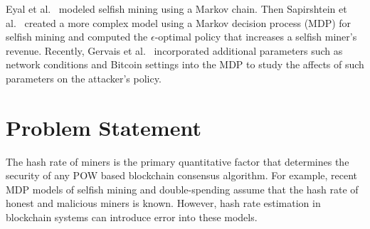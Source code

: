 Eyal et al.~\cite{eyal:2014} modeled selfish mining using a Markov chain. Then Sapirshtein et al.~\cite{sapirshtein:2015} created a more complex model using a Markov decision process (MDP) for selfish mining and computed the $\epsilon$-optimal policy that increases a selfish miner's revenue. Recently, Gervais et al.~\cite{Gervais:2016} incorporated additional parameters such as network conditions and Bitcoin settings into the MDP to study the affects of such parameters on the attacker's policy. %

\section{Problem Statement}
The hash rate of miners is the primary quantitative factor that determines the security of any POW based blockchain consensus algorithm. For example, recent MDP models of selfish mining and double-spending assume that the hash rate of honest and malicious miners is known. However, hash rate estimation in blockchain systems can introduce error into these models. 


